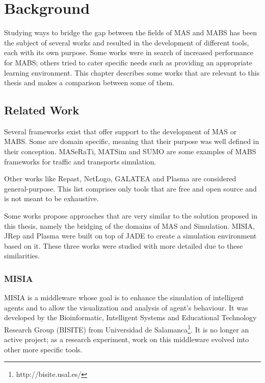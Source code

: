 \chapter{Background}
\label{chap:background}

Studying ways to bridge the gap between the fields of MAS and MABS has been the subject of several works and resulted in the development of different tools, each with its own purpose. Some works were in search of increased performance for MABS; others tried to cater specific needs such as providing an appropriate learning environment. This chapter describes some works that are relevant to this thesis and makes a comparison between some of them.

\section{Related Work}
Several frameworks exist that offer support to the development of MAS or MABS. Some are domain specific, meaning that their purpose was well defined in their conception. MASeRaTi\cite{ahlbrecht2014scalable}, MATSim\cite{balmer2008agent} and SUMO\cite{SUMO2012} are some examples of MABS frameworks for traffic and transports simulation. 

Other works like Repast\cite{collier2003repast}, NetLogo\cite{tisue2004netlogo}, GALATEA\cite{davila2000galatea} and Plasma \cite{warden2010towards} are considered general-purpose. This list comprises only tools that are free and open source and is not meant to be exhaustive. 

Some works propose approaches that are very similar to the solution proposed in this thesis, namely the bridging of the domains of MAS and Simulation. MISIA, JRep and Plasma were built on top of JADE to create a simulation environment based on it. These three works were studied with more detailed due to these similarities.

\subsection{MISIA}
MISIA is a middleware whose goal is to enhance the simulation of intelligent agents and to allow the visualization and analysis of agent's behaviour. It was developed by the Bioinformatic, Intelligent Systems and Educational Technology Research Group (BISITE) from Universidad de Salamanca\footnote{http://bisite.usal.es/}. It is no longer an active project; as a research experiment, work on this middleware evolved into other more specific tools.

